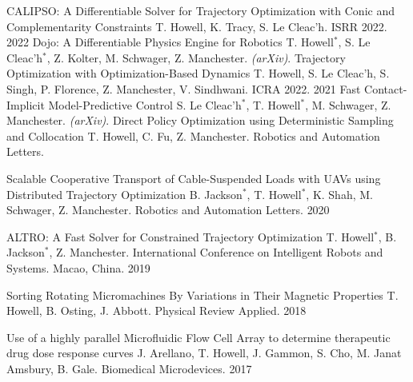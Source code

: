 


\begin{cvhonors}

	\cvhonor
	{CALIPSO: A Differentiable Solver for Trajectory Optimization with Conic and Complementarity Constraints} %
	{T. Howell, K. Tracy, S. Le Cleac'h. ISRR 2022.} %
	{}
	{2022} %
	\cvhonor
	{Dojo: A Differentiable Physics Engine for Robotics} %
	{T. Howell$^*$, S. Le Cleac'h$^*$, Z. Kolter, M. Schwager, Z. Manchester. \textit{(arXiv)}.} %
	{}
	{} %
   \cvhonor
	{Trajectory Optimization with Optimization-Based Dynamics} %
	{T. Howell, S. Le Cleac'h, S. Singh, P. Florence, Z. Manchester, V. Sindhwani. ICRA 2022.} %
	{}
	{2021} %
   \cvhonor
	{Fast Contact-Implicit Model-Predictive Control} %
	{S. Le Cleac'h$^*$, T. Howell$^*$, M. Schwager, Z. Manchester. \textit{(arXiv)}.} %
	{}
	{} %
  \cvhonor
    {Direct Policy Optimization using Deterministic Sampling and Collocation} %
    {T. Howell, C. Fu, Z. Manchester. Robotics and Automation Letters.} %
    {}
    {} %
    
  \cvhonor
    {Scalable Cooperative Transport of Cable-Suspended Loads with UAVs using Distributed Trajectory Optimization} %
    {B. Jackson$^*$, T. Howell$^*$, K. Shah, M. Schwager, Z. Manchester. Robotics and Automation Letters.} %
    {}
    {2020} %
    
  \cvhonor
    {ALTRO: A Fast Solver for Constrained Trajectory Optimization}
    {T. Howell$^*$, B. Jackson$^*$, Z. Manchester. International Conference on Intelligent Robots and Systems. Macao, China.}
    {}
    {2019}
    
  \cvhonor
    {Sorting Rotating Micromachines By Variations in Their Magnetic Properties}
    {T. Howell, B. Osting, J. Abbott. Physical Review Applied.} 
    {}
    {2018}
    
  \cvhonor
    {Use of a highly parallel Microfluidic Flow Cell Array to determine therapeutic drug dose response curves}
    {J. Arellano, T. Howell, J. Gammon, S. Cho, M. Janat Amsbury, B. Gale. Biomedical Microdevices.}
    {}
    {2017}
    
\end{cvhonors}
